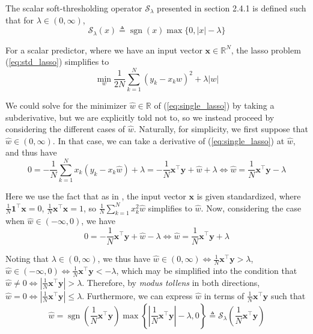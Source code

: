 \documentclass{article}
\numberwithin{equation}{section}
\begin{document}

The scalar soft-thresholding operator $ \mathcal{S}_\lambda $ presented in
section 2.4.1 is defined such that for $ \lambda \in (0, \infty) $,
\begin{equation} \label{eq:soft_threshold}
    \mathcal{S}_\lambda(x) \triangleq
    \operatorname{sgn}(x)\max\{0, |x| - \lambda\}
\end{equation}

For a scalar predictor, where we have an input vector $ \mathbf{x} \in
\mathbb{R}^N $, the lasso problem (\ref{eq:std_lasso}) simplifies to
\begin{equation} \label{eq:single_lasso}
    \min_w\frac{1}{2N}\sum_{k = 1}^N(y_k - x_kw)^2 + \lambda|w|
\end{equation}

We could solve for the minimizer $ \hat{w} \in \mathbb{R} $ of
(\ref{eq:single_lasso}) by taking a subderivative, but we are explicitly
told not to, so we instead proceed by considering the different cases of
$ \hat{w} $. Naturally, for simplicity, we first suppose that
$ \hat{w} \in (0, \infty) $. In that case, we can take a derivative of
(\ref{eq:single_lasso}) at $ \hat{w} $, and thus have
\begin{equation*}
    0 = -\frac{1}{N}\sum_{k = 1}^Nx_k(y_k - x_k\hat{w}) + \lambda =
    -\frac{1}{N}\mathbf{x}^\top\mathbf{y} + \hat{w} + \lambda \Leftrightarrow
    \hat{w} = \frac{1}{N}\mathbf{x}^\top\mathbf{y} - \lambda
\end{equation*}

Here we use the fact that as in , the input vector
$ \mathbf{x} $ is given standardized, where $ \frac{1}{N}\mathbf{1}^\top
\mathbf{x} = 0 $, $ \frac{1}{N}\mathbf{x}^\top\mathbf{x} = 1 $, so
$ \frac{1}{N}\sum_{k = 1}^Nx_k^2\hat{w} $ simplifies to $ \hat{w} $. Now,
considering the case when $ \hat{w} \in (-\infty, 0) $, we have
\begin{equation*}
    0 = -\frac{1}{N}\mathbf{x}^\top\mathbf{y} + \hat{w} - \lambda
    \Leftrightarrow \hat{w} = \frac{1}{N}\mathbf{x}^\top\mathbf{y} + \lambda
\end{equation*}

Noting that $ \lambda \in (0, \infty) $, we thus have $ \hat{w} \in
(0, \infty) \Leftrightarrow \frac{1}{N}\mathbf{x}^\top\mathbf{y} > \lambda $,
$ \hat{w} \in (-\infty, 0) \Leftrightarrow \frac{1}{N}\mathbf{x}^\top
\mathbf{y} < -\lambda $, which may be simplified into the condition that
$ \hat{w} \ne 0 \Leftrightarrow \left|\frac{1}{N}\mathbf{x}^\top
\mathbf{y}\right| > \lambda $. Therefore, by \textit{modus tollens} in both
directions, $ \hat{w} = 0 \Leftrightarrow \left|\frac{1}{N}\mathbf{x}^\top
\mathbf{y}\right| \le \lambda $. Furthermore, we can express $ \hat{w} $ in
terms of $ \frac{1}{N}\mathbf{x}^\top\mathbf{y} $ such that
\begin{equation*}
    \hat{w} =
    \operatorname{sgn}\left(\frac{1}{N}\mathbf{x}^\top\mathbf{y}\right)
    \max\left\{
        \left|\frac{1}{N}\mathbf{x}^\top\mathbf{y}\right| - \lambda, 0
    \right\} \triangleq
    \mathcal{S}_\lambda\left(\frac{1}{N}\mathbf{x}^\top\mathbf{y}\right)
\end{equation*}
\end{document}
